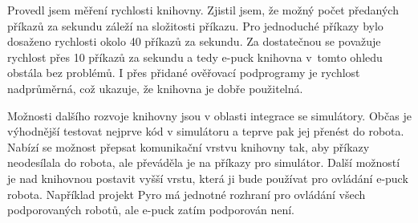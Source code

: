     Provedl jsem měření rychlosti knihovny. Zjistil jsem, že možný
    počet předaných příkazů za sekundu záleží na složitosti příkazu.
    Pro jednoduché příkazy bylo dosaženo rychlosti okolo 40 příkazů za sekundu.
    Za dostatečnou se považuje rychlost přes 10 příkazů za sekundu a tedy
    e-puck knihovna v~tomto ohledu obstála bez problémů. I přes přidané
    ověřovací podprogramy je rychlost nadprůměrná, což ukazuje, že knihovna je
    dobře použitelná.

    Možnosti dalšího rozvoje knihovny jsou v oblasti integrace se simulátory.
    Občas je výhodnější testovat nejprve kód v simulátoru a teprve pak jej
    přenést do robota. Nabízí se možnost přepsat komunikační vrstvu knihovny
    tak, aby příkazy neodesílala do robota, ale převáděla je na příkazy pro
    simulátor. Další možností je nad knihovnou postavit vyšší vrstu, která ji
    bude používat pro ovládání e-puck robota. Například projekt Pyro má
    jednotné rozhraní pro ovládání všech podporovaných robotů, ale e-puck zatím
    podporován není.
